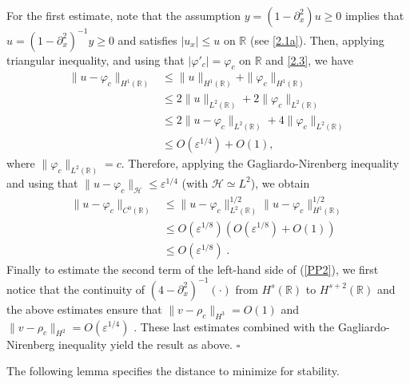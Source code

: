 \documentclass[10pt,a4paper,twoside]{article}
\begin{document}
For the first estimate,  note that the assumption $y=(1-\partial^{2}_{x})u\ge 0$ implies that 
$u=(1-\partial^{2}_{x})^{-1}y\ge 0$ and satisfies $|u_{x}|\le u$ on $\mathbb{R}$ (see \eqref{2.1a}). Then, applying triangular inequality, and using that $|\varphi'_{c}|=\varphi_{c}$ on $\mathbb{R}$ and \eqref{2.3}, we have 
\begin{align*}
\|u-\varphi_{c}\|_{H^{1}(\mathbb{R})}&\le\|u\|_{H^{1}(\mathbb{R})}
+\|\varphi_{c}\|_{H^{1}(\mathbb{R})}\\
&\le 2\|u\|_{L^{2}(\mathbb{R})}+2\|\varphi_{c}\|_{L^{2}(\mathbb{R})}\\
&\le 2\|u-\varphi_{c}\|_{L^{2}(\mathbb{R})}+4\|\varphi_{c}\|_{L^{2}(\mathbb{R})}\\
&\le O(\varepsilon^{1/4})+O(1),
\end{align*}
where $\|\varphi_{c}\|_{L^{2}(\mathbb{R})}=c$. Therefore, applying the Gagliardo-Nirenberg inequality and using that $\|u-\varphi_{c}\|_{\mathcal{H}}\le \varepsilon^{1/4}$ (with $\mathcal{H}\simeq L^{2}$), we obtain
\begin{align*}
\|u-\varphi_{c}\|_{C^{0}(\mathbb{R})}&\le 
\|u-\varphi_{c}\|^{1/2}_{L^{2}(\mathbb{R})}
\|u-\varphi_{c}\|^{1/2}_{H^{1}(\mathbb{R})}\\
&\le O(\varepsilon^{1/8})\left(O(\varepsilon^{1/8})+O(1)\right)\\
&\le O(\varepsilon^{1/8})\; .
\end{align*}
Finally to estimate the second term of the left-hand side of (\ref{PP2}), we first notice that  the continuity of $ (4-\partial_x^2) ^{-1}(\cdot) $ from $ H^s(\mathbb{R}) $ to $ H^{s+2}(\mathbb{R}) $ and the above estimates ensure that $\|v-\rho_c \|_{H^3} =O(1) $ and $\| v-\rho_c\|_{H^2} =O(\varepsilon^{1/4}) $ . These last estimates combined with  the Gagliardo-Nirenberg inequality yield the result as above.
\hfill $ \square $ \vspace*{2mm} 

The following lemma specifies the distance to minimize for stability.
\end{document}
